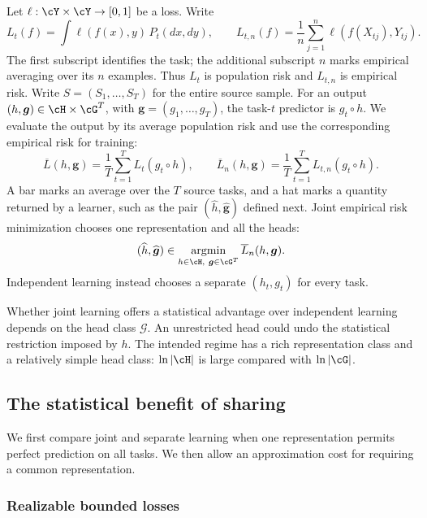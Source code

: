 \documentclass[11pt,twoside]{article}
\theoremstyle{definition}
\theoremstyle{remark}
\begin{document}
Let $\ell:\cY\times\cY\to[0,1]$ be a loss. Write
\begin{equation}
 L_t(f)=\int\ell(f(x),y)\,P_t(dx,dy),
 \qquad
 L_{t,n}(f)=\frac1n\sum_{j=1}^n\ell(f(X_{tj}),Y_{tj}).
 \label{eq:task-risks}
\end{equation}
The first subscript identifies the task; the additional subscript $n$
marks empirical averaging over its $n$ examples. Thus $L_t$ is population
risk and $L_{t,n}$ is empirical risk. Write
$S=(S_1,\ldots,S_T)$ for the entire source sample.
For an output $(h,\boldsymbol g)\in\cH\times\cG^T$, with
$\boldsymbol g=(g_1,\ldots,g_T)$, the task-$t$ predictor is $g_t\circ h$.
We evaluate the output by its average population risk and use the
corresponding empirical risk for training:
\begin{equation}
 \overline L(h,\boldsymbol g)=\frac1T\sum_{t=1}^T L_t(g_t\circ h),
 \qquad
 \overline L_n(h,\boldsymbol g)
 =\frac1T\sum_{t=1}^T L_{t,n}(g_t\circ h).
 \label{eq:average-risks}
\end{equation}
A bar marks an average over the $T$ source tasks, and a hat marks a quantity
returned by a learner, such as the pair $(\widehat h,\widehat{\boldsymbol g})$
defined next.
Joint empirical risk minimization chooses one representation and all the heads:
\begin{equation}
 (\widehat h,\widehat{\boldsymbol g})
 \in\mathop{\rm argmin}_{h\in\cH,\ \boldsymbol g\in\cG^T}
       \overline L_n(h,\boldsymbol g).
 \label{eq:joint-erm}
\end{equation}
Independent learning instead chooses a separate $(h_t,g_t)$ for every task.

Whether joint learning offers a statistical advantage over independent
learning depends on the head class \(\mathcal G\).
An unrestricted head could undo
the statistical restriction imposed by $h$. The intended regime has a rich
representation class and a relatively simple head class:
$\ln|\cH|$ is large compared with $\ln|\cG|$.

\subsection{The statistical benefit of sharing}
\label{sec:joint-statistics}

We first compare joint and separate learning when one representation permits
perfect prediction on all tasks. We then allow an approximation cost for
requiring a common representation.

\subsubsection{Realizable bounded losses}
\end{document}
